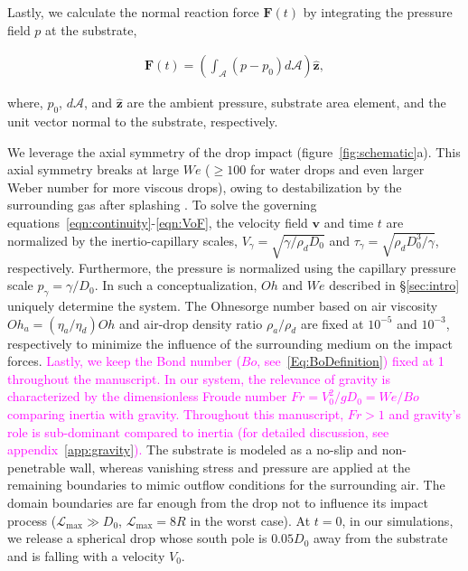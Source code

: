 \documentclass{jfm}
\newcommand{\Rev}[1]{\todo[color=orange, bordercolor=none, textcolor=white]{R2}\textcolor{magenta}{#1}}
\begin{document}
\noindent Lastly, we calculate the normal reaction force $\boldsymbol{F}(t)$ by integrating the pressure field $p$ at the substrate,

\begin{align}\label{Eqn:ReactionForce}
	\boldsymbol{F}(t) = \left(\int_\mathcal{A} \left(p-p_0\right)d\mathcal{A}\right)\hat{\boldsymbol{z}},
\end{align}

\noindent where, $p_0$, $d\mathcal{A}$, and $\hat{\boldsymbol{z}}$ are the ambient pressure, substrate area element, and the unit vector normal to the substrate, respectively. 

We leverage the axial symmetry of the drop impact (figure~\ref{fig:schematic}a). This axial symmetry breaks at large $We$ ($\ge 100$ for water drops and even larger Weber number for more viscous drops), owing to destabilization by the surrounding gas after splashing \citep{xu2005drop, Eggers2010, Driscoll2011, riboux2014experiments, Josserand2016, zhang2022impact}. 
To solve the governing equations~\eqref{eqn:continuity}-\eqref{eqn:VoF}, the velocity field $\boldsymbol{v}$ and time $t$ are normalized by the inertio-capillary scales, $V_\gamma = \sqrt{\gamma/\rho_dD_0}$ and $\tau_\gamma = \sqrt{\rho_dD_0^3/\gamma}$, respectively. Furthermore, the pressure is normalized using the capillary pressure scale $p_\gamma = \gamma/D_0$. In such a conceptualization, $Oh$ and $We$ described in \S\ref{sec:intro} uniquely determine the system. 
The Ohnesorge number based on air viscosity $Oh_a = \left(\eta_a/\eta_d\right)Oh$ and air-drop density ratio $\rho_a/\rho_d$ are fixed at $10^{-5}$ and $10^{-3}$, respectively to minimize the influence of the surrounding medium on the impact forces. 
\Rev{Lastly, we keep the Bond number ($Bo$, see~\eqref{Eq:BoDefinition}) fixed at 1 throughout the manuscript. In our system, the relevance of gravity is characterized by the dimensionless Froude number $Fr = V_0^2/gD_0 = We/Bo$ comparing inertia with gravity. Throughout this manuscript, $Fr > 1$ and gravity's role is sub-dominant compared to inertia (for detailed discussion, see appendix~\ref{app:gravity}).}
The substrate is modeled as a no-slip and non-penetrable wall, whereas vanishing stress and pressure are applied at the remaining boundaries to mimic outflow conditions for the surrounding air. The domain boundaries are far enough from the drop not to influence its impact process ($\mathcal{L}_\text{max} \gg D_0$, $\mathcal{L}_\text{max} = 8R$ in the worst case). 
At $t = 0$, in our simulations, we release a spherical drop whose south pole is $0.05D_0$ away from the substrate and is falling with a velocity $V_0$. 
\end{document}
